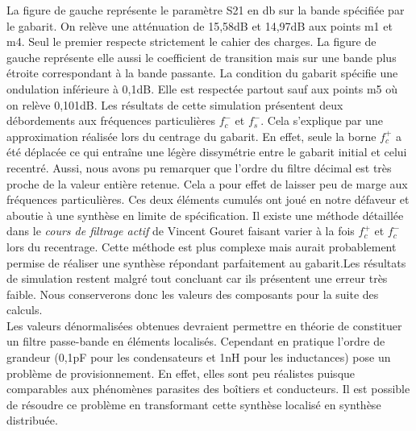 \documentclass[french]{article}
\begin{document}
La figure de gauche représente le paramètre S21 en db sur la bande spécifiée par le gabarit. On relève une atténuation de 15,58dB et 14,97dB aux points m1 et m4. Seul le premier respecte strictement le cahier des charges. La figure de gauche représente elle aussi le coefficient de transition mais sur une bande plus étroite correspondant à la bande passante. La condition du gabarit spécifie une ondulation inférieure à 0,1dB. Elle est respectée partout sauf aux points m5 où on relève 0,101dB. Les résultats de cette simulation présentent deux débordements aux fréquences particulières $f_c^-$ et $f_s^-$. Cela s'explique par une approximation réalisée lors du centrage du gabarit. En effet, seule la borne $f_c^+$ a été déplacée ce qui entraîne une légère dissymétrie entre le gabarit initial et celui recentré. Aussi, nous avons pu remarquer que l'ordre du filtre décimal est très proche de la valeur entière retenue. Cela a pour effet de laisser peu de marge aux fréquences particulières. Ces deux éléments cumulés ont joué en notre défaveur et aboutie à une synthèse en limite de spécification. 
Il existe une méthode détaillée dans le \textit{cours de filtrage actif} de Vincent Gouret faisant varier à la fois $f_c^+$ et $f_c^-$ lors du recentrage. Cette méthode est plus complexe mais aurait probablement permise de réaliser une synthèse répondant parfaitement au gabarit.Les résultats de simulation restent malgré tout concluant car ils présentent une erreur très faible. Nous conserverons donc les valeurs des composants pour la suite des calculs.\\

Les valeurs dénormalisées obtenues devraient permettre en théorie de constituer un filtre passe-bande en éléments localisés. Cependant en pratique l'ordre de grandeur (0,1pF pour les condensateurs et 1nH pour les inductances) pose un problème de provisionnement. En effet, elles sont peu réalistes puisque comparables aux phénomènes parasites des boîtiers et conducteurs. Il est possible de résoudre ce problème en transformant cette synthèse localisé en synthèse distribuée.
\end{document}
